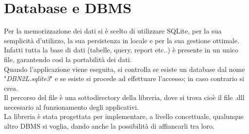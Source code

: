 \documentclass[a4paper,10pt]{report}
\begin{document}
	\section{Database e DBMS}
		Per la memorizzazione dei dati si è scelto di utilizzare SQLite,
			per la sua semplicità d’utilizzo, la sua persistenza in locale
			e per la sua gestione ottimale.\\
			Infatti tutta la base di dati (tabelle, query, report etc..) è presente in
			un unico file, garantendo così la portabilità dei dati.\\
			Quando l’applicazione viene eseguita, si controlla se esiste un database
			dal nome "{\itshape DBN2L.sqlite3}" e se esiste si procede ad effettuare
			l’accesso; in caso contrario si crea.\\
			Il percorso del file è una sottodirectory della libreria, dove si trova
			cioè il file .dll necessario al funzionamento degli applicativi.\\
			La libreria è stata progettata per implementare, a livello concettuale,
			qualunque altro DBMS si voglia, dando anche la possibilità di affiancarli
			tra loro.
\end{document}
